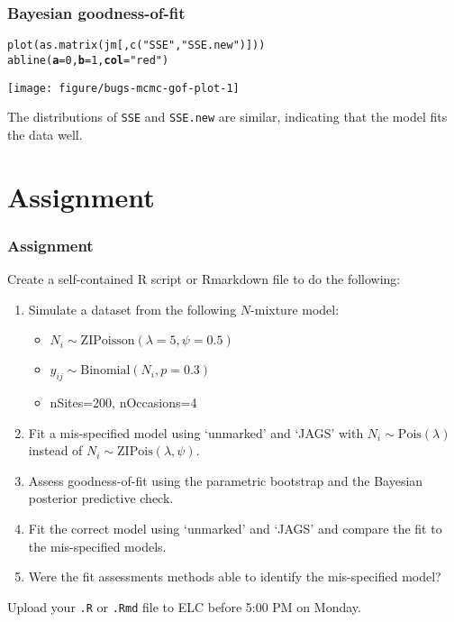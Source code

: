 \documentclass[color=usenames,dvipsnames]{beamer}\usepackage[]{graphicx}\usepackage[]{color}
\makeatletter
\newcommand{\hlnum}[1]{\textcolor[rgb]{0.69,0.494,0}{#1}}%
\newcommand{\hlstr}[1]{\textcolor[rgb]{0.749,0.012,0.012}{#1}}%
\newcommand{\hlstd}[1]{\textcolor[rgb]{0,0,0}{#1}}%
\newcommand{\hlkwc}[1]{\textcolor[rgb]{0,0,0}{\textbf{#1}}}%
\newcommand{\hlkwd}[1]{\textcolor[rgb]{0.004,0.004,0.506}{#1}}%
\newenvironment{kframe}{%
 \def\at@end@of@kframe{}%
 \ifinner\ifhmode%
  \def\at@end@of@kframe{\end{minipage}}%
  \begin{minipage}{\columnwidth}%
 \fi\fi%
 \def\FrameCommand##1{\hskip\@totalleftmargin \hskip-\fboxsep
 \colorbox{shadecolor}{##1}\hskip-\fboxsep
     \hskip-\linewidth \hskip-\@totalleftmargin \hskip\columnwidth}%
 \MakeFramed {\advance\hsize-\width
   \@totalleftmargin\z@ \linewidth\hsize
   \@setminipage}}%
 {\par\unskip\endMakeFramed%
 \at@end@of@kframe}
\newenvironment{knitrout}{}{} %
\newcommand{\inr}[1]{\colorbox{inlinecolor}{\texttt{#1}}}
\makeatother
\begin{document}
\begin{frame}[fragile]
  \frametitle{Bayesian goodness-of-fit}
\begin{knitrout}\footnotesize
{}\color{fgcolor}\begin{kframe}
\begin{alltt}
\hlkwd{plot}\hlstd{(}\hlkwd{as.matrix}\hlstd{(jm[,}\hlkwd{c}\hlstd{(}\hlstr{"SSE"}\hlstd{,} \hlstr{"SSE.new"}\hlstd{)]))}
\hlkwd{abline}\hlstd{(}\hlkwc{a}\hlstd{=}\hlnum{0}\hlstd{,} \hlkwc{b}\hlstd{=}\hlnum{1}\hlstd{,} \hlkwc{col}\hlstd{=}\hlstr{"red"}\hlstd{)}
\end{alltt}
\end{kframe}

{\centering \texttt{[image: figure/bugs-mcmc-gof-plot-1]} 

}


\end{knitrout}
  \vfill
  \small
  The distributions of {\tt SSE} and {\tt SSE.new} are similar,
  indicating that the model fits the data well.
\end{frame}






\section{Assignment}




\begin{frame}[fragile]
  \frametitle{Assignment}
  \footnotesize
  Create a self-contained R script or Rmarkdown file
  to do the following:
  \vfill
  \begin{enumerate}
    \footnotesize
    \item Simulate a dataset from the following $N$-mixture model:
      \begin{itemize}
        \footnotesize
        \item $N_i \sim \mathrm{ZIPoisson}(\lambda=5, \psi=0.5)$
        \item $y_{ij} \sim \mathrm{Binomial}(N_i, p=0.3)$
        \item nSites=200, nOccasions=4
      \end{itemize}
    \item Fit a \alert{mis-specified model} using `unmarked' and `JAGS' with
      $N_i \sim \mathrm{Pois}(\lambda)$ instead of
      $N_i \sim \mathrm{ZIPois}(\lambda, \psi)$.
    \item Assess goodness-of-fit using the parametric bootstrap and
      the Bayesian posterior predictive check.
    \item Fit the \alert{correct model} using `unmarked' and `JAGS'
      and compare the fit to the mis-specified models.
    \item Were the fit assessments methods able to identify the
      mis-specified model?
  \end{enumerate}
  \vfill
  Upload your {\tt .R} or {\tt .Rmd} file to ELC before 5:00 PM on Monday. 
\end{frame}
\end{document}
